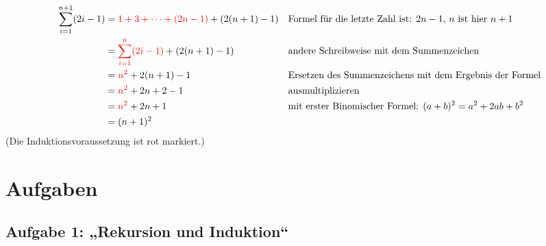 \documentclass{lehramt-informatik}
\begin{document}
{\footnotesize
\begin{align*}
\sum^{n+1}_{i=1} (2i-1)
  &= {\color{red}1 + 3 + \cdots + (2n - 1)} + (2(n+1)-1) && \text{Formel für die letzte Zahl ist: } 2n - 1 \text{, } n \text{ ist hier } n + 1\\
  &= {\color{red} \sum^n_{i=1} (2i-1)} + (2(n+1)-1) && \text{andere Schreibweise mit dem Summenzeichen}\\
  &= {\color{red} n^2} + 2(n + 1) - 1 && \text{Ersetzen des Summenzeichens mit dem Ergebnis der Formel}\\
  &= {\color{red} n^2} + 2n + 2 - 1 && \text{ausmultiplizieren}\\
  &= {\color{red} n^2} + 2n + 1 && \text{mit erster Binomischer Formel: } (a+b)^{2}=a^{2}+2ab+b^{2} \\
  &= (n+1)^2
\end{align*}
}
(Die Induktionsvoraussetzung ist rot markiert.)


\chapter{Aufgaben}

%

\section{Aufgabe 1: „Rekursion und Induktion“}

\begin{quellen}
\item \cite[Seite 25]{aud:fs:1}
\item \cite[Seite 2-3, Thema 1, Aufgabe 1b]{examen:66115:2014:03}
\end{quellen}
\end{document}
